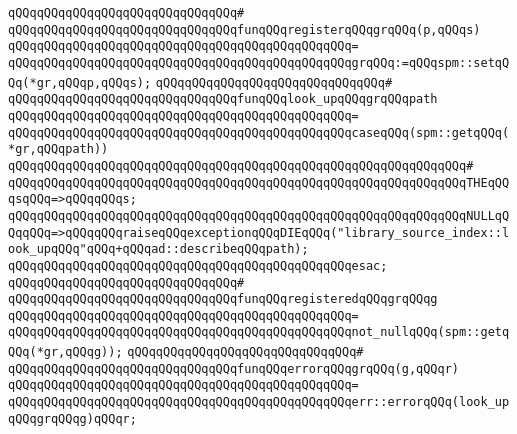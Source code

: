 \newline
\verb|qQQqqQQqqQQqqQQqqQQqqQQqqQQqqQQq#|\newline
\verb|qQQqqQQqqQQqqQQqqQQqqQQqqQQqqQQqfunqQQqregisterqQQqgrqQQq(p,qQQqs)|\newline
\verb|qQQqqQQqqQQqqQQqqQQqqQQqqQQqqQQqqQQqqQQqqQQqqQQq=|\newline
\verb|qQQqqQQqqQQqqQQqqQQqqQQqqQQqqQQqqQQqqQQqqQQqqQQqgrqQQq:=qQQqspm::setqQQq(*gr,qQQqp,qQQqs);|\newline
\newline
\verb|qQQqqQQqqQQqqQQqqQQqqQQqqQQqqQQq#|\newline
\verb|qQQqqQQqqQQqqQQqqQQqqQQqqQQqqQQqfunqQQqlook_upqQQqgrqQQqpath|\newline
\verb|qQQqqQQqqQQqqQQqqQQqqQQqqQQqqQQqqQQqqQQqqQQqqQQq=|\newline
\verb|qQQqqQQqqQQqqQQqqQQqqQQqqQQqqQQqqQQqqQQqqQQqqQQqcaseqQQq(spm::getqQQq(*gr,qQQqpath))|\newline
\verb|qQQqqQQqqQQqqQQqqQQqqQQqqQQqqQQqqQQqqQQqqQQqqQQqqQQqqQQqqQQqqQQq#|\newline
\verb|qQQqqQQqqQQqqQQqqQQqqQQqqQQqqQQqqQQqqQQqqQQqqQQqqQQqqQQqqQQqqQQqTHEqQQqsqQQq=>qQQqqQQqs;|\newline
\verb|qQQqqQQqqQQqqQQqqQQqqQQqqQQqqQQqqQQqqQQqqQQqqQQqqQQqqQQqqQQqqQQqNULLqQQqqQQq=>qQQqqQQqraiseqQQqexceptionqQQqDIEqQQq("library_source_index::look_upqQQq"qQQq+qQQqad::describeqQQqpath);|\newline
\verb|qQQqqQQqqQQqqQQqqQQqqQQqqQQqqQQqqQQqqQQqqQQqqQQqesac;|\newline
\newline
\verb|qQQqqQQqqQQqqQQqqQQqqQQqqQQqqQQq#|\newline
\verb|qQQqqQQqqQQqqQQqqQQqqQQqqQQqqQQqfunqQQqregisteredqQQqgrqQQqg|\newline
\verb|qQQqqQQqqQQqqQQqqQQqqQQqqQQqqQQqqQQqqQQqqQQqqQQq=|\newline
\verb|qQQqqQQqqQQqqQQqqQQqqQQqqQQqqQQqqQQqqQQqqQQqqQQqnot_nullqQQq(spm::getqQQq(*gr,qQQqg));|\newline
\newline
\verb|qQQqqQQqqQQqqQQqqQQqqQQqqQQqqQQq#|\newline
\verb|qQQqqQQqqQQqqQQqqQQqqQQqqQQqqQQqfunqQQqerrorqQQqgrqQQq(g,qQQqr)|\newline
\verb|qQQqqQQqqQQqqQQqqQQqqQQqqQQqqQQqqQQqqQQqqQQqqQQq=|\newline
\verb|qQQqqQQqqQQqqQQqqQQqqQQqqQQqqQQqqQQqqQQqqQQqqQQqerr::errorqQQq(look_upqQQqgrqQQqg)qQQqr;|\newline
